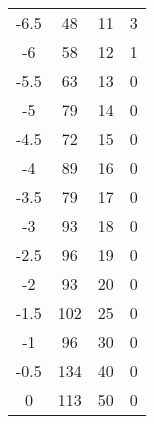 \begin{table}
\begin{tabular}{c c || c c}
        -6.5   &   48     &    11      &   3    \\
        -6     &   58     &    12      &   1    \\
        -5.5   &   63     &    13      &   0    \\
        -5     &   79     &    14      &   0    \\
        -4.5   &   72     &    15      &   0    \\
        -4     &   89     &    16      &   0    \\
        -3.5   &   79     &    17      &   0    \\
        -3     &   93     &    18      &   0    \\
        -2.5   &   96     &    19      &   0    \\
        -2     &   93     &    20      &   0    \\
        -1.5   &   102    &    25      &   0    \\
        -1     &   96     &    30      &   0    \\
        -0.5   &   134    &    40      &   0    \\
        0      &   113    &       50   &   0    \\
    \end{tabular}
\end{table}
 